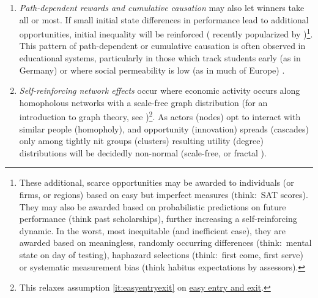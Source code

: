 \begin{enumerate}
	The truth, as often, will lie somewhere in between, and greatly depend on circumstance. Some of the divergence between scalable and unscalable occupations will fall on workers, some on consumers and much will be split\footnote{
		Such flexibility does justice to \cite{Baumol1965} original insight, which started out as an empirical observation on the relative pay of the performing arts, and not as an(other) iron law of wages (c.f. \citealt{Malthus1798}).}.

	\item {} \label{sec:cumulativecausation} \emph{Path-dependent rewards and cumulative causation} may also let winners take all or most. If small initial state differences in performance lead to additional opportunities, initial inequality will be reinforced (\citealt{Jackson1968, Merton1988} recently popularized by \citealt{Gladwell})\footnote{
		These additional, scarce opportunities may be awarded to individuals (or firms, or regions) based on easy but imperfect measures (think:\ SAT scores). They may also be awarded based on probabilistic predictions on future performance (think past scholarships), further increasing a self-reinforcing dynamic. In the worst, most inequitable (and inefficient case), they are awarded based on meaningless, randomly occurring differences (think:\ mental state on day of testing), haphazard selections (think:\ first come, first serve) or systematic measurement bias (think habitus expectations by assessors).}.
	This pattern of path-dependent or cumulative causation is often observed in educational systems, particularly in those which track students early (as in Germany) or where social permeability is low (as in much of Europe) \citep{OECD2006}.

	\item {} \label{sec:networkeffects} \emph{Self-reinforcing network effects} occur where economic activity occurs along homopholous networks with a scale-free graph distribution (for an introduction to graph theory, see \citealt{Kleinberg-2009-oz})\footnote{
		This relaxes  assumption \ref{it:easyentryexit} on \hyperref[it:easyentryexit]{easy entry and exit}.}.
	As actors (nodes) opt to interact with similar people (homopholy), and opportunity (innovation) spreads (cascades) only among tightly nit groups (clusters) \citep{Bass1969} resulting utility (degree) distributions will be decidedly non-normal (scale-free, or fractal \citep{Mandelbrot2004}).



\end{enumerate}
